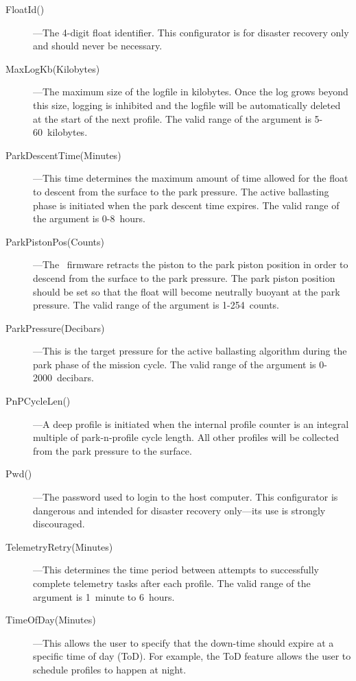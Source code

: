 \begin{description}
\item[FloatId()]---The 4-digit float identifier.  This configurator is for
  disaster recovery only and should never be necessary.
      
\item[MaxLogKb(Kilobytes)]---The maximum size of the logfile in kilobytes.
  Once the log grows beyond this size, logging is inhibited and the logfile
  will be automatically deleted at the start of the next profile.  The valid
  range of the argument is 5-60~kilobytes.

\item[ParkDescentTime(Minutes)]---This time determines the maximum amount of
  time allowed for the float to descent from the surface to the park
  pressure.  The active ballasting phase is initiated when the park descent
  time expires.  The valid range of the argument is 0-8~hours.

\item[ParkPistonPos(Counts)]---The \apf\ firmware retracts the piston to the
  park piston position in order to descend from the surface to the park
  pressure.  The park piston position should be set so that the float will
  become neutrally buoyant at the park pressure.  The valid range of the
  argument is 1-254~counts.
                                 
\item[ParkPressure(Decibars)]---This is the target pressure for the active
  ballasting algorithm during the park phase of the mission cycle.  The
  valid range of the argument is 0-2000~decibars.

\item[PnPCycleLen()]---A deep profile is initiated when the internal profile
  counter is an integral multiple of park-n-profile cycle length.  All other
  profiles will be collected from the park pressure to the surface.
      
\item[Pwd()]---The password used to login to the host computer.  This
  configurator is dangerous and intended for disaster recovery only---its
  use is strongly discouraged.

\item[TelemetryRetry(Minutes)]---This determines the time period between
  attempts to successfully complete telemetry tasks after each profile.  The
  valid range of the argument is 1~minute to 6~hours.

\item[TimeOfDay(Minutes)]---This allows the user to specify that the
  down-time should expire at a specific time of day (ToD).  For example, the
  ToD feature allows the user to schedule profiles to happen at night.


\end{description}
